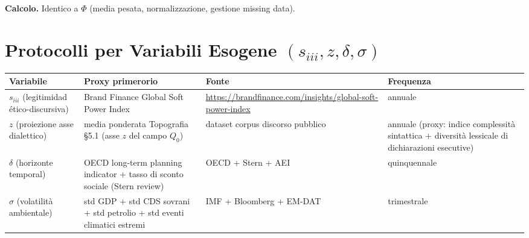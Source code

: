 \Hypoth{} \textbf{Calcolo.} Identico a \(\Phi\) (media pesata,
normalizzazione, gestione missing data).



\section{\texorpdfstring{Protocolli per Variabili Esogene
\((s_{iii}, z, \delta, \sigma)\)}{Protocolli per Variabili Esogene (s\_\{iii\}, z, \textbackslash delta, \textbackslash sigma)}}\label{protocolli-per-variables-esogene-s_iii-z-delta-sigma}

{\def\LTcaptype{none} %
{\small\begin{longtable}[]{@{}
  >{\raggedright\arraybackslash}p{}
  >{\raggedright\arraybackslash}p{}
  >{\raggedright\arraybackslash}p{}
  >{\raggedright\arraybackslash}p{}@{}}
\toprule\noalign{}
\begin{minipage}[b]{\linewidth}\raggedright
Variabile
\end{minipage} & \begin{minipage}[b]{\linewidth}\raggedright
Proxy primerorio
\end{minipage} & \begin{minipage}[b]{\linewidth}\raggedright
Fonte
\end{minipage} & \begin{minipage}[b]{\linewidth}\raggedright
Frequenza
\end{minipage} \\
\midrule\noalign{}
\endhead
\bottomrule\noalign{}
\endlastfoot
\(s_{iii}\) (legitimidad ético-discursiva) & Brand Finance Global Soft
Power Index &
\url{https://brandfinance.com/insights/global-soft-power-index} &
annuale \\
\(z\) (proiezione asse dialettico) & media ponderata Topografia \S{}5.1
(asse \(z\) del campo \(Q_0\)) & dataset corpus discorso pubblico &
annuale (proxy: indice complessità sintattica + diversità lessicale di
dichiarazioni esecutive) \\
\(\delta\) (horizonte temporal) & OECD long-term planning indicator +
tasso di sconto sociale (Stern review) & OECD + Stern + AEI &
quinquennale \\
\(\sigma\) (volatilità ambientale) & std GDP + std CDS sovrani + std
petrolio + std eventi climatici estremi & IMF + Bloomberg + EM-DAT &
trimestrale \\
\end{longtable}}
}

